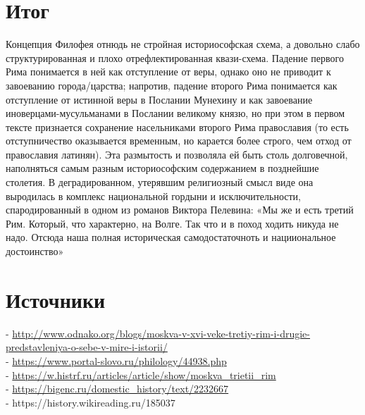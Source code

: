 \documentclass[a4paper, 12pt]{article}
\begin{document}
\section{Итог}
Концепция Филофея отнюдь не стройная историософская схема, а довольно слабо структурированная и плохо отрефлектированная квази-схема. Падение первого Рима понимается в ней как отступление от веры, однако оно не приводит к завоеванию города/царства; напротив, падение второго Рима понимается как отступление от истинной веры в Послании Мунехину и как завоевание иноверцами-мусульманами в Послании великому князю, но при этом в первом тексте признается сохранение насельниками второго Рима православия (то есть отступничество оказывается временным, но карается более строго, чем отход от православия латинян). Эта размытость и позволяла ей быть столь долговечной, наполняться самым разным историософским содержанием в позднейшие столетия. В деградированном, утерявшим религиозный смысл виде она выродилась в комплекс национальной гордыни и исключительности, спародированный в одном из романов Виктора Пелевина: «Мы же и есть третий Рим. Который, что характерно, на Волге. Так что и в поход ходить никуда не надо. Отсюда наша полная историческая самодостаточноть и нацииональное достоинство»

\section{Источники}
- \url{http://www.odnako.org/blogs/moskva-v-xvi-veke-tretiy-rim-i-drugie-predstavleniya-o-sebe-v-mire-i-istorii/}\\
- \url{https://www.portal-slovo.ru/philology/44938.php}\\
- \url{https://w.histrf.ru/articles/article/show/moskva_trietii_rim}\\
- \url{https://bigenc.ru/domestic_history/text/2232667}\\
- https://history.wikireading.ru/185037
\end{document}

